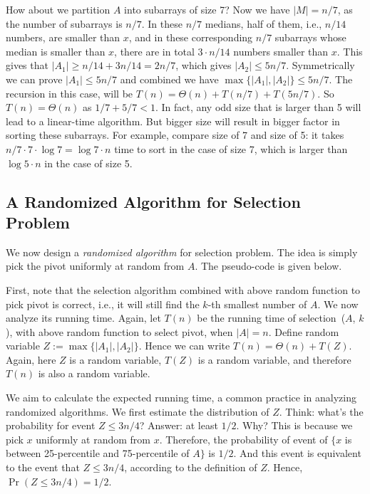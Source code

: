 How about we partition $A$ into subarrays of size 7?
Now we have $|M| = n/7$, as the number of subarrays is $n/7$.
In these $n/7$ medians, half of them, i.e., $n/14$ numbers, are smaller than $x$,
and in these corresponding $n/7$ subarrays whose median is smaller than $x$, there are in total $3\cdot n/14$ numbers smaller than $x$.
This gives that $|A_1| \ge n/14 + 3n/14 = 2n/7$, which gives $|A_2| \le 5n/7$. Symmetrically we can prove $|A_1| \le 5n/7$ and combined we have 
$\max\{|A_1|, |A_2|\} \le 5n/7$.
The recursion in this case, will be $T(n) = \Theta(n) + T(n/7) + T(5n/7)$.
So $T(n) = \Theta(n)$ as $1/7 + 5/7 < 1$. 
In fact, any odd size that is larger than 5 will lead to a linear-time algorithm.
But bigger size will result in bigger factor in sorting these subarrays. 
For example, compare size of 7 and size of 5: it takes $n/7 \cdot 7 \cdot \log 7 = \log 7 \cdot n$ time to sort in the case of size 7,
which is larger than $\log 5 \cdot n$ in the case of size 5.

\subsection*{A Randomized Algorithm for Selection Problem}

We now design a \emph{randomized algorithm} for selection problem.
The idea is simply pick the pivot uniformly at random from $A$.
The pseudo-code is given below.

\begin{algorithmblock}[0.8\textwidth]
	\xxx
	\xxx
\end{algorithmblock}

First, note that the selection algorithm combined with above random function to pick pivot is correct, i.e., it will still find the
$k$-th smallest number of $A$.
We now analyze its running time. 
Again, let $T(n)$ be the running time of selection~($A$, $k$), with above random function to select pivot, when $|A| = n$. 
Define random variable $Z := \max\{|A_1|, |A_2|\}$.
Hence we can write $T(n) = \Theta(n) + T(Z)$.
Again, here $Z$ is a random variable, $T(Z)$ is a random variable, and therefore $T(n)$ is also a random variable.

We aim to calculate the expected running time, a common practice in analyzing randomized algorithms.
We first estimate the distribution of $Z$.
Think: what's the probability for event $Z \le 3n/4$?
Answer: at least $1/2$. Why? This is because we pick $x$ uniformly at random from $x$.
Therefore, the probability of event of $\{x$ is between 25-percentile and 75-percentile of $A\}$ is $1/2$.
And this event is equivalent to the event that $Z \le 3n/4$, according to the definition of $Z$.
Hence, $\Pr(Z \le 3n/4) = 1/2$.

